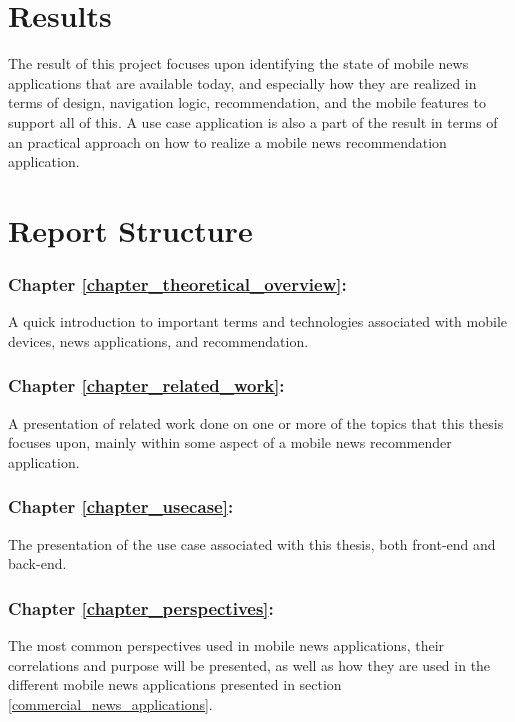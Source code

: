 \section{Results}
The result of this project focuses upon identifying the state of mobile news applications that are available today, and especially how they are realized in terms of design, navigation logic, recommendation, and the mobile features to support all of this. A use case application is also a part of the result in terms of an practical approach on how to realize a mobile news recommendation application.

\section{Report Structure}

\subsubsection{Chapter \ref{chapter_theoretical_overview}: }
A quick introduction to important terms and technologies associated with mobile devices, news applications, and recommendation.

\subsubsection{Chapter \ref{chapter_related_work}: }
A presentation of related work done on one or more of the topics that this thesis focuses upon, mainly within some aspect of a mobile news recommender application.


\subsubsection{Chapter \ref{chapter_usecase}: }
The presentation of the use case associated with this thesis, both front-end and back-end.


\subsubsection{Chapter \ref{chapter_perspectives}: }
The most common perspectives used in mobile news applications, their correlations and purpose will be presented, as well as how they are used in the different mobile news applications presented in section \ref{commercial_news_applications}.

